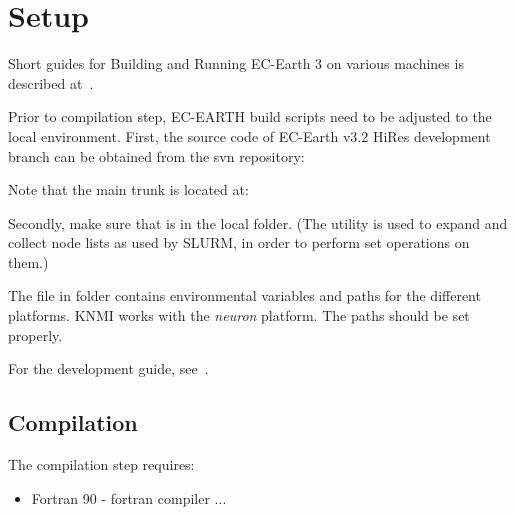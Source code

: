 
\chapter{Setup}
Short guides for Building and Running EC-Earth 3 on various machines is described at~\cite{br-wiki}.

Prior to compilation step, EC-EARTH build scripts need to be adjusted to the local environment. 
First, the source code of EC-Earth v3.2 HiRes development branch can be obtained from the svn repository: 
    
    \begin{center}
    \end{center}
    
Note that the main trunk is located at:

    \begin{center}
    \end{center}


Secondly, make sure that  is %
in the local  folder. 
(The utility  is used to expand and collect node lists as used by SLURM, in order to perform set operations on them.)

The file  in  folder contains environmental variables and paths for the different platforms. 
KNMI works with the \emph{neuron} platform. The paths should be set properly. 



For the development guide, see~\cite{dev-guide}.



\section{Compilation}

The compilation step requires:
\begin{itemize}
    \item Fortran 90 - fortran compiler
    ...
\end{itemize}



